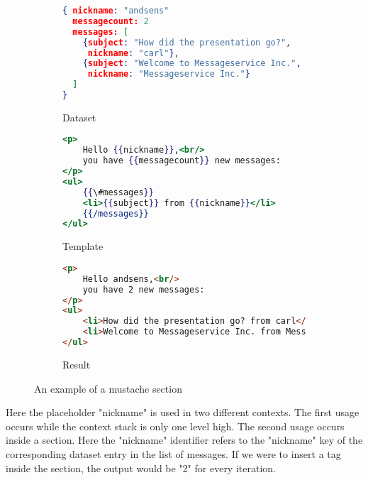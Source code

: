 \documentclass[thesis.tex]{subfiles}
\begin{document}
\begin{figure}
	\centering
	\begin{subfigure}{\textwidth}
		\caption{Dataset}
		\label{fig:section-example.json}
		\begin{lstlisting}[language=JSON]
{ nickname: "andsens"
  messagecount: 2
  messages: [
  	{subject: "How did the presentation go?",
  	 nickname: "carl"},
  	{subject: "Welcome to Messageservice Inc.",
  	 nickname: "Messageservice Inc."}
  ]
}
		\end{lstlisting}
	\end{subfigure}
	
	\begin{subfigure}{\textwidth}
		\caption{Template}
		\label{fig:section-example.mustache}
		\begin{lstlisting}[language=mustache]
<p>
	Hello {{nickname}},<br/>
	you have {{messagecount}} new messages:
</p>
<ul>
	{{\#messages}}
	<li>{{subject}} from {{nickname}}</li>
	{{/messages}}
</ul>
		\end{lstlisting}
	\end{subfigure}
	
	\begin{subfigure}{\textwidth}
		\caption{Result}
		\label{fig:section-example.html}
		\begin{lstlisting}[language=HTML]
<p>
	Hello andsens,<br/>
	you have 2 new messages:
</p>
<ul>
	<li>How did the presentation go? from carl</li>
	<li>Welcome to Messageservice Inc. from Messageservice Inc.</li>
</ul>
		\end{lstlisting}
	\end{subfigure}
	\caption{An example of a mustache section}
	\label{fig:section-example}
\end{figure}
Here the placeholder "nickname" is used in two different contexts.
The first usage occurs while the context stack is only one level high.
The second usage occurs inside a section. Here the "nickname" identifier refers
to the "nickname" key of the corresponding dataset entry in the list of messages.
If we were to insert a  tag inside the section,
the output would be "2" for every iteration.
\end{document}
